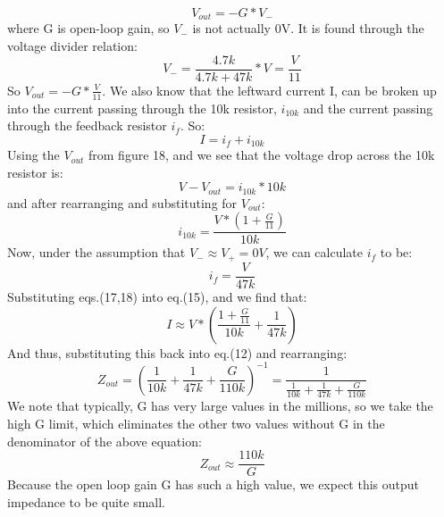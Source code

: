 \documentclass{article}
\begin{document}
    \begin{equation}
        V_{out} = -G*V_-
    \end{equation}
    where G is open-loop gain, so $V_-$ is not actually 0V. It is found through the voltage divider relation: 
    \begin{equation}
        V_- = \frac{4.7k}{4.7k + 47k} * V = \frac{V}{11}
    \end{equation}
    So $V_{out} = -G*\frac{V}{11}$. We also know that the leftward current I, can be broken up into the current passing through the 10k resistor, $i_{10k}$ and the current passing through the feedback resistor $i_f$. So:
    \begin{equation}
        I = i_f + i_{10k}
    \end{equation}
    Using the $V_{out}$ from figure 18, and we see that the voltage drop across the 10k resistor is:
    \begin{equation}
        V - V_{out} = i_{10k} * 10k
    \end{equation}
    and after rearranging and substituting for $V_{out}$:
    \begin{equation}
        i_{10k} = \frac{V * (1 + \frac{G}{11})}{10k} 
    \end{equation}
    Now, under the assumption that $V_- \approx V_+ = 0V$, we can calculate $i_f$ to be:
    \begin{equation}
        i_f = \frac{V}{47k}
    \end{equation}
    Substituting eqs.(17,18) into eq.(15), and we find that:
    \begin{equation}
        I \approx V * (\frac{1 + \frac{G}{11}}{10k} + \frac{1}{47k})
    \end{equation}
    And thus, substituting this back into eq.(12) and rearranging:
    \begin{equation}
        Z_{out} = (\frac{1}{10k} + \frac{1}{47k} + \frac{G}{110k})^{-1} = \frac{1}{\frac{1}{10k} + \frac{1}{47k} + \frac{G}{110k}}
    \end{equation}
    We note that typically, G has very large values in the millions, so we take the high G limit, which eliminates the other two values without G in the denominator of the above equation:
    \begin{equation}
        Z_{out} \approx \frac{110k}{G}
    \end{equation}
    Because the open loop gain G has such a high value, we expect this output impedance to be quite small. 
\end{document}
